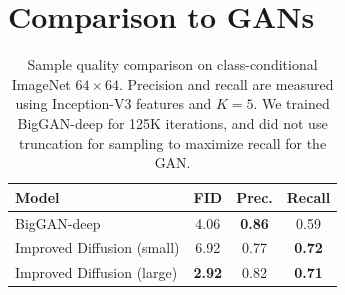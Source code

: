 \documentclass{article}
\begin{document}

\section{Comparison to GANs}
\begin{table}[t]
    \caption{\label{tbl:classcondfid} Sample quality comparison on class-conditional ImageNet $64 \times 64$. Precision and recall \citep{improvedpr} are measured using Inception-V3 features and $K=5$. We trained BigGAN-deep for 125K iterations, and did not use truncation for sampling to maximize recall for the GAN.}
    \centering
    \vskip 0.15in
	\begin{center}
	\begin{small}
    \begin{tabular}{lccc}
        \toprule
        Model & FID & Prec. & Recall \\
        \midrule
        BigGAN-deep \citep{biggan} & 4.06 & \bf 0.86 & 0.59 \\
        Improved Diffusion (small) & 6.92 & 0.77 & \bf 0.72 \\ 
        Improved Diffusion (large) & \bf 2.92 & 0.82 & \bf 0.71 \\
        \bottomrule
    \end{tabular}
\end{small}
\end{center}
\vskip -0.1in
\end{table}
\end{document}
